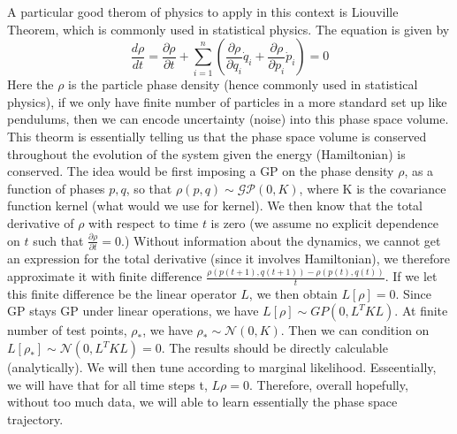 \documentclass{article}
\begin{document}
A particular good therom of physics to apply in this context is Liouville Theorem, which is commonly used in statistical physics. 
The equation is given by 
$$
\frac{d \rho}{d t}=\frac{\partial \rho}{\partial t}+\sum_{i=1}^{n}\left(\frac{\partial \rho}{\partial q_{i}} \dot{q}_{i}+\frac{\partial \rho}{\partial p_{i}} \dot{p}_{i}\right)=0
$$
Here the $\rho$ is the particle phase density (hence commonly used in statistical physics), if we only have finite number of particles in a more standard set up like pendulums, then we can encode uncertainty (noise) into this phase space volume. 
This theorm is essentially telling us that the phase space volume is conserved throughout the evolution of the system given the energy (Hamiltonian) is conserved. 
The idea would be first imposing a GP on the phase density $\rho$, as a function of phases $p, q$, so that $\rho(p, q)\sim \mathcal{GP}(0, K)$, where K is the covariance function kernel (what would we use for kernel).
We then know that the total derivative of $\rho$ with respect to time $t$ is zero (we assume no explicit dependence on $t$ such that $\frac{\partial \rho}{\partial t}=0.$)
Without information about the dynamics, we cannot get an expression for the total derivative (since it involves Hamiltonian), we therefore approximate it with finite difference $\frac{\rho(p(t+1), q(t+1))-\rho(p(t), q(t))}{t}$.  
If we let this finite difference be the linear operator $L$, we then obtain $L[\rho]=0$.
Since GP stays GP under linear operations, we have $L[\rho]\sim GP(0, L^TKL)$.
At finite number of test points, $\rho_*$, we have $\rho_*\sim \mathcal{N}(0, K)$. 
Then we can condition on $L[\rho_*]\sim\mathcal{N}(0, L^TKL)=0$.
The results should be directly calculable (analytically).
We will then tune according to marginal likelihood.
Esseentially, we will have that for all time steps t, $L{\rho}=0.$
Therefore, overall hopefully, without too much data, we will able to learn essentially the phase space trajectory.
\end{document}
